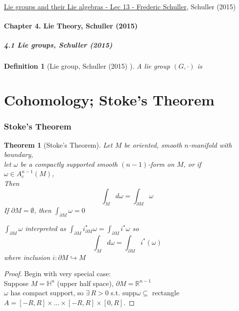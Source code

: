 \documentclass[10pt]{amsart}
\newtheorem{theorem}{Theorem}
\newtheorem{definition}{Definition}
\begin{document}
\begin{multicols*}{2}
\href{https://youtu.be/mJ8ZDdA10GY}{Lie groups and their Lie algebras - Lec 13 - Frederic Schuller}, Schuller (2015) \cite{Schu2015}

\subsection{Chapter 4. Lie Theory, Schuller (2015) \cite{Schu2015}}

\subsubsection{4.1 Lie groups, Schuller (2015) \cite{Schu2015}}

\begin{definition}[Lie group, Schuller (2015) \cite{Schu2015}] A lie group $(G, \cdot )$ is 
\end{definition}

\part{Cohomology; Stoke's Theorem}

\section{Stoke's Theorem}

\begin{theorem}[Stoke's Theorem]
	Let $M$ be oriented, smooth $n$-manifold with boundary, \\
	let $\omega$ be a compactly supported smooth $(n-1)$-form on $M$, or if $\omega \in A_c^{n-1}(M)$, \\
	Then
	\begin{equation}
	\int_M d\omega = \int_{\partial M} \omega
	\end{equation} 
	If $\partial M = \emptyset$, then $\int_{\partial M} \omega = 0$
	
	$\int_{\partial M} \omega$ interpreted as $\int_{\partial M} i^*_{\partial M} \omega = \int_{\partial M} i^*\omega$ so 
	\begin{equation}
	\int_M d\omega = \int_{\partial M} i^*(\omega)
	\end{equation}
	where inclusion $i: \partial M \hookrightarrow M$
\end{theorem}

\begin{proof}
Begin with very special case: \\
Suppose $M = \mathbb{H}^n$ (upper half space), $\partial M = \mathbb{R}^{n-1}$ \\
$\omega$ has compact support, so $\exists \, R >0$ s.t. $\text{supp}\omega \subseteq $ rectangle $A=[-R,R] \times \dots \times [-R, R] \times [0,R]$.  


\end{proof}
\end{multicols*}
\end{document}
